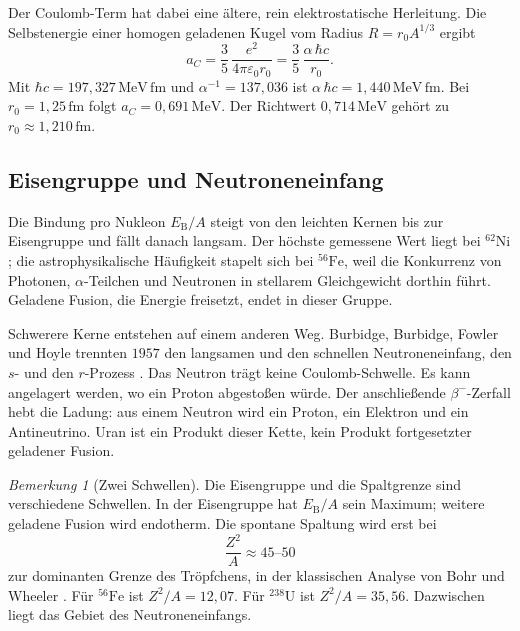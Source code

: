\documentclass[11pt,a4paper]{article}
\theoremstyle{definition}
\theoremstyle{remark}
\newtheorem{bemerkung}{Bemerkung}[section]
\newcommand{\EB}{E_{\mathrm{B}}}
\begin{document}
Der Coulomb-Term hat dabei eine ältere, rein elektrostatische Herleitung. Die Selbstenergie einer homogen geladenen Kugel vom Radius \(R=r_0 A^{1/3}\) ergibt
\begin{equation}
\label{eq:coulombklassisch}
a_C = \frac{3}{5}\,\frac{e^2}{4\pi\varepsilon_0 r_0} = \frac{3}{5}\,\frac{\alpha\,\hbar c}{r_0}.
\end{equation}
Mit \(\hbar c=197{,}327\,\mathrm{MeV\,fm}\) und \(\alpha^{-1}=137{,}036\) ist \(\alpha\,\hbar c=1{,}440\,\mathrm{MeV\,fm}\). Bei \(r_0=1{,}25\,\mathrm{fm}\) folgt \(a_C=0{,}691\,\mathrm{MeV}\). Der Richtwert \(0{,}714\,\mathrm{MeV}\) gehört zu \(r_0\approx 1{,}210\,\mathrm{fm}\).

\subsection{Eisengruppe und Neutroneneinfang}

Die Bindung pro Nukleon \(\EB/A\) steigt von den leichten Kernen bis zur Eisengruppe und fällt danach langsam. Der höchste gemessene Wert liegt bei \(^{62}\mathrm{Ni}\); die astrophysikalische Häufigkeit stapelt sich bei \(^{56}\mathrm{Fe}\), weil die Konkurrenz von Photonen, \(\alpha\)-Teilchen und Neutronen in stellarem Gleichgewicht dorthin führt. Geladene Fusion, die Energie freisetzt, endet in dieser Gruppe.

Schwerere Kerne entstehen auf einem anderen Weg. Burbidge, Burbidge, Fowler und Hoyle trennten \(1957\) den langsamen und den schnellen Neutroneneinfang, den \(s\)- und den \(r\)-Prozess \cite{B2FH}. Das Neutron trägt keine Coulomb-Schwelle. Es kann angelagert werden, wo ein Proton abgestoßen würde. Der anschließende \(\beta^-\)-Zerfall hebt die Ladung: aus einem Neutron wird ein Proton, ein Elektron und ein Antineutrino. Uran ist ein Produkt dieser Kette, kein Produkt fortgesetzter geladener Fusion.

\begin{bemerkung}[Zwei Schwellen]
Die Eisengruppe und die Spaltgrenze sind verschiedene Schwellen. In der Eisengruppe hat \(\EB/A\) sein Maximum; weitere geladene Fusion wird endotherm. Die spontane Spaltung wird erst bei
\begin{equation}
\label{eq:fissil}
\frac{Z^2}{A}\approx 45\text{--}50
\end{equation}
zur dominanten Grenze des Tröpfchens, in der klassischen Analyse von Bohr und Wheeler \cite{BohrWheeler1939}. Für \(^{56}\mathrm{Fe}\) ist \(Z^2/A=12{,}07\). Für \(^{238}\mathrm{U}\) ist \(Z^2/A=35{,}56\). Dazwischen liegt das Gebiet des Neutroneneinfangs.
\end{bemerkung}
\end{document}
